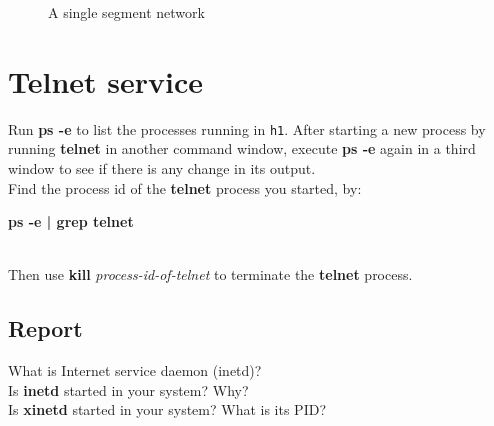 \documentclass[10pt,a4paper]{article}
\numberwithin{equation}{section}
\numberwithin{figure}{section}
\numberwithin{table}{section}
\begin{document}
\begin{center}
\begin{minipage}{0.48\textwidth}
\begin{flushright}
\begin{figure}[H]
                \caption{A single segment network}        
            \end{figure}
        \end{flushright}
    \end{minipage}
\end{center}



    \section{Telnet service}
    Run \textbf{ps -e} to list the processes running in \texttt{h1}.
    After starting a new process by running \textbf{telnet} in another command window, execute \textbf{ps -e} again in a third window to see if there is any change in its output. \\
    Find the process id of the \textbf{telnet} process you started, by: \\
    \centerline{\textbf{ps -e | grep telnet}} \\
    Then use \textbf{kill} \textit{process-id-of-telnet} to terminate the \textbf{telnet} process.
    \subsection*{Report}
    What is Internet service daemon (inetd)? \\
    Is \textbf{inetd} started in your system?
    Why? \\
    Is \textbf{xinetd} started in your system? What is its PID? \\

\end{document}
